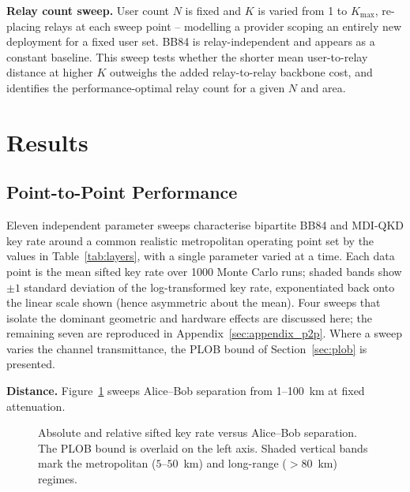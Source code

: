 \documentclass[12pt]{article}
\let\oldsection\section
\renewcommand{\section}{\clearpage\oldsection}
\begin{document}
\textbf{Relay count sweep.} User count $N$ is fixed and $K$ is varied from 1 to $K_\text{max}$, re-placing relays at each sweep point -- modelling a provider scoping an entirely new deployment for a fixed user set. BB84 is relay-independent and appears as a constant baseline. This sweep tests whether the shorter mean user-to-relay distance at higher $K$ outweighs the added relay-to-relay backbone cost, and identifies the performance-optimal relay count for a given $N$ and area.

\section{Results}
\label{sec:results}

\subsection{Point-to-Point Performance}
\label{sec:results_p2p}

Eleven independent parameter sweeps characterise bipartite BB84 and MDI-QKD key rate around a common realistic metropolitan operating point set by the values in Table~\ref{tab:layers}, with a single parameter varied at a time. Each data point is the mean sifted key rate over 1000 Monte Carlo runs; shaded bands show $\pm 1$ standard deviation of the log-transformed key rate, exponentiated back onto the linear scale shown (hence asymmetric about the mean). Four sweeps that isolate the dominant geometric and hardware effects are discussed here; the remaining seven are reproduced in Appendix~\ref{sec:appendix_p2p}. Where a sweep varies the channel transmittance, the PLOB bound of Section~\ref{sec:plob} is presented.

\textbf{Distance.} Figure~\ref{fig:p2p_length} sweeps Alice--Bob separation from 1--100~km at fixed attenuation.

\begin{figure}[H]
    \centering
    
    \caption{Absolute and relative sifted key rate versus Alice--Bob separation. The PLOB bound is overlaid on the left axis. Shaded vertical bands mark the metropolitan ($5$--$50$~km) and long-range ($>80$~km) regimes.}
    \label{fig:p2p_length}
\end{figure}
\end{document}
